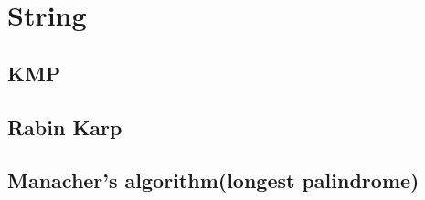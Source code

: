 \newpage
\section{String}

\subsection{KMP}


\subsection{Rabin Karp}

\subsection{Manacher's algorithm(longest palindrome)}
